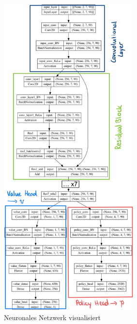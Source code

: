 \documentclass[
  manuscript=article,  %
  layout=publish,  %
  year=2023,
  volume=1,
]{extra/joas}
\begin{document}
\begin{figure}
    \centering
    \includegraphics[width={0.63\textwidth}]{imgs/model.jpg}
    \caption{Neuronales Netzwerk visualisiert}
    \label{fig:model}
\end{figure}
\end{document}
